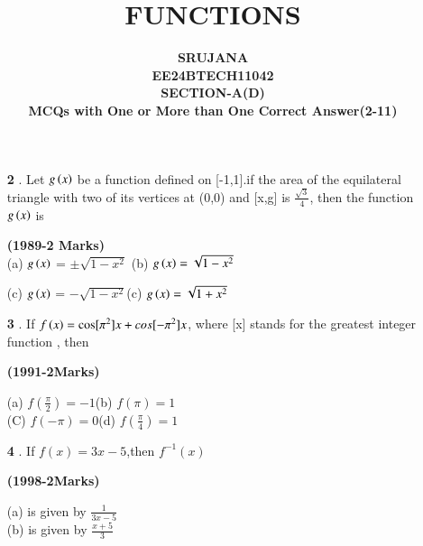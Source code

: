 \documentclass[journal,12pt,twocolumn]{IEEEtran}
\theoremstyle{remark}
\begin{document}

\vspace{3cm}

\title{\textbf{FUNCTIONS}}
\author{\textbf{SRUJANA\\EE24BTECH11042\\SECTION-A(D)\\MCQs with One or More than One Correct Answer(2-11)}}


\maketitle
\newpage
\bigskip

\renewcommand{\thefigure}{\theenumi}
\renewcommand{\thetable}{\theenumi}

\begin{enumerate}

\item[\textbf{2}]. Let $g\left(x\right)$ be a function defined on [-1,1].if the area of the 
   equilateral triangle with two of its vertices at (0,0) and [x,g] is $\frac{\sqrt{3}}{4}$, then the function $g\left(x\right)$ is
   
   \hfill\textbf{(1989-2 Marks)}\\
   
(a) $g\left(x\right)$ = $\pm\sqrt{1-x^2}$\hspace{1cm} (b) $g\left(x\right) = \sqrt{1-x^2}$

(c) $g\left(x\right)$  = $-\sqrt{1-x^2}$\hspace{1cm}(c) $g\left(x\right)=\sqrt{1+x^2}$\\

\item[\textbf{3}]. If $f\left(x\right) = \cos[\pi^2]x + cos[-\pi^2]x$, where [x] stands for the greatest integer function , then  

\hfill\textbf{(1991-2Marks)}

(a) $f(\frac{\pi}{2})=-1$\hspace{1cm}(b) $f(\pi)=1$\\
(C) $f(-\pi)=0$\hspace{1cm}(d) $f(\frac{\pi}{4})=1$\\

\item[\textbf{4}]. If $f(x)=3x-5$,then $f^{-1}(x)$

\hfill\textbf{(1998-2Marks)}

(a) is given by $\frac{1}{3x-5}$\\

(b) is given by $\frac{x+5}{3}$


\end{enumerate}
\end{document}
